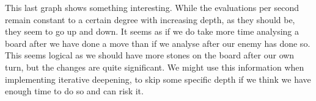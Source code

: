 This last graph shows something interesting. While the evaluations per second remain constant to a certain degree with increasing depth, as they should be, they seem to go up and down. It seems as if we do take more time analysing a board after we have done a move than if we analyse after our enemy has done so. This seems logical as we should have more stones on the board after our own turn, but the changes are quite significant. We might use this information when implementing iterative deepening, to skip some specific depth if we think we have enough time to do so and can risk it.
